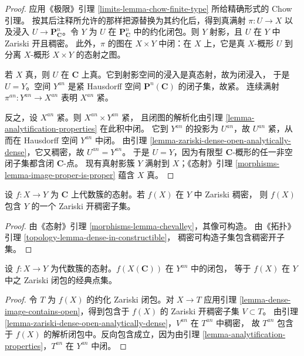 \begin{proof}
应用《极限》引理 \ref{limits-lemma-chow-finite-type} 所给精确形式的 Chow 引理。
按其后注释所允许的那样把源替换为其约化后，得到真满射 $\pi : U \to X$
以及浸入 $U \to \mathbf P^n_{\mathbf C}$。令 $Y$ 为 $U$ 在
$\mathbf P^n_{\mathbf C}$ 中的约化闭包。则 $Y$ 射影，且 $U$ 在 $Y$ 中 Zariski 开且稠密。
此外，$\pi$ 的图在 $X\times Y$ 中闭：在 $X$ 上，它是真 $X$-概形 $U$
到分离 $X$-概形 $X\times Y$ 的态射之图。

若 $X$ 真，则 $U$ 在 $\mathbf C$ 上真。它到射影空间的浸入是真态射，故为闭浸入，
于是 $U=Y$。空间 $Y^{an}$ 是紧 Hausdorff 空间 $\mathbf P^n(\mathbf C)$ 的闭子集，故紧。
连续满射 $\pi^{an}:Y^{an}\to X^{an}$ 表明 $X^{an}$ 紧。

反之，设 $X^{an}$ 紧。则 $X^{an}\times Y^{an}$ 紧，
且闭图的解析化由引理 \ref{lemma-analytification-properties} 在此积中闭。
它到 $Y^{an}$ 的投影为 $U^{an}$，故 $U^{an}$ 紧，从而在 Hausdorff 空间 $Y^{an}$ 中闭。
由引理 \ref{lemma-zariski-dense-open-analytically-dense}，它又稠密，故 $U^{an}=Y^{an}$。
于是 $U=Y$，因为有限型 $\mathbf C$-概形的任一非空闭子集都含闭 $\mathbf C$-点。
现有真射影簇 $Y$ 满射到 $X$；《态射》引理
\ref{morphisms-lemma-image-proper-is-proper} 蕴含 $X$ 真。
\end{proof}

\begin{lemma}
\label{lemma-dense-image-contains-open}
设 $f : X \to Y$ 为 $\mathbf C$ 上代数簇的态射。若 $f(X)$ 在 $Y$ 中 Zariski 稠密，
则 $f(X)$ 包含 $Y$ 的一个 Zariski 开稠密子集。
\end{lemma}

\begin{proof}
由《态射》引理 \ref{morphisms-lemma-chevalley}，其像可构造。
由《拓扑》引理 \ref{topology-lemma-dense-in-constructible}，
稠密可构造子集包含稠密开子集。
\end{proof}

\begin{proposition}
\label{proposition-image-closure}
设 $f : X \to Y$ 为代数簇的态射。$f(X(\mathbf C))$ 在 $Y^{an}$ 中的闭包，
等于 $f(X)$ 在 $Y$ 中之 Zariski 闭包的经典点集。
\end{proposition}

\begin{proof}
令 $T$ 为 $f(X)$ 的约化 Zariski 闭包。对 $X\to T$ 应用引理
\ref{lemma-dense-image-contains-open}，得到包含于 $f(X)$ 的 Zariski 开稠密子集 $V\subset T$。
由引理 \ref{lemma-zariski-dense-open-analytically-dense}，$V^{an}$ 在 $T^{an}$ 中稠密，
故 $T^{an}$ 包含于 $f(X)$ 的解析闭包中。反向包含成立，因为由引理
\ref{lemma-analytification-properties}，$T^{an}$ 在 $Y^{an}$ 中闭。
\end{proof}


